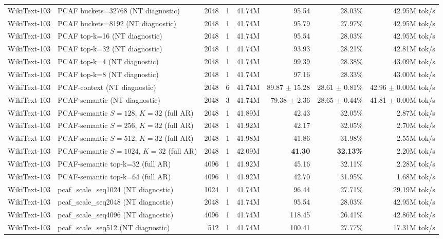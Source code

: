 \documentclass{article}
\begin{document}
\begin{table}[H]
{\begin{tabular}{@{}llrrrrrr@{}}
    WikiText-103 & PCAF buckets=32768 (NT diagnostic) & 2048 & 1 & 41.74M & 95.54 & 28.03\% & 42.95M tok/s \\
    WikiText-103 & PCAF buckets=8192 (NT diagnostic) & 2048 & 1 & 41.74M & 95.79 & 27.97\% & 42.95M tok/s \\
    WikiText-103 & PCAF top-k=16 (NT diagnostic) & 2048 & 1 & 41.74M & 95.54 & 28.03\% & 42.95M tok/s \\
    WikiText-103 & PCAF top-k=32 (NT diagnostic) & 2048 & 1 & 41.74M & 93.93 & 28.21\% & 42.81M tok/s \\
    WikiText-103 & PCAF top-k=4 (NT diagnostic) & 2048 & 1 & 41.74M & 99.39 & 28.38\% & 43.09M tok/s \\
    WikiText-103 & PCAF top-k=8 (NT diagnostic) & 2048 & 1 & 41.74M & 97.16 & 28.33\% & 43.00M tok/s \\
    WikiText-103 & PCAF-context (NT diagnostic) & 2048 & 6 & 41.74M & 89.87 $\pm$ 15.28 & 28.61 $\pm$ 0.81\% & 42.96 $\pm$ 0.00M tok/s \\
    WikiText-103 & PCAF-semantic (NT diagnostic) & 2048 & 3 & 41.74M & 79.38 $\pm$ 2.36 & 28.65 $\pm$ 0.44\% & 41.81 $\pm$ 0.00M tok/s \\
    \midrule
    WikiText-103 & PCAF-semantic $S=128$, $K=32$ (full AR) & 2048 & 1 & 41.89M & 42.43 & 32.05\% & 2.87M tok/s \\
    WikiText-103 & PCAF-semantic $S=256$, $K=32$ (full AR) & 2048 & 1 & 41.92M & 42.17 & 32.05\% & 2.70M tok/s \\
    WikiText-103 & PCAF-semantic $S=512$, $K=32$ (full AR) & 2048 & 1 & 41.98M & 41.86 & 31.98\% & 2.55M tok/s \\
    WikiText-103 & PCAF-semantic $S=1024$, $K=32$ (full AR) & 2048 & 1 & 42.09M & \textbf{41.30} & \textbf{32.13\%} & 2.20M tok/s \\
    \midrule
    WikiText-103 & PCAF-semantic top-k=32 (full AR) & 4096 & 1 & 41.92M & 45.16 & 32.11\% & 2.28M tok/s \\
    WikiText-103 & PCAF-semantic top-k=64 (full AR) & 4096 & 1 & 41.92M & 42.70 & 31.95\% & 1.68M tok/s \\
    WikiText-103 & pcaf\_scale\_seq1024 (NT diagnostic) & 1024 & 1 & 41.74M & 96.44 & 27.71\% & 29.19M tok/s \\
    WikiText-103 & pcaf\_scale\_seq2048 (NT diagnostic) & 2048 & 1 & 41.74M & 95.54 & 28.03\% & 42.95M tok/s \\
    WikiText-103 & pcaf\_scale\_seq4096 (NT diagnostic) & 4096 & 1 & 41.74M & 118.45 & 26.41\% & 42.86M tok/s \\
    WikiText-103 & pcaf\_scale\_seq512 (NT diagnostic) & 512 & 1 & 41.74M & 100.41 & 27.77\% & 17.31M tok/s \\
    \bottomrule
  \end{tabular}
  }
  \endgroup
\end{table}
\FloatBarrier
\end{document}
